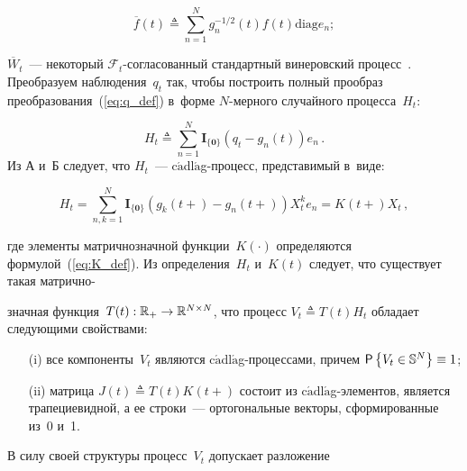 \begin{multicols}{2}
\vspace*{-2pt}

\noindent 
$$
\overline{f}(t) \triangleq \sum\limits_{n=1}^N g_n^{-{1}/{2}}(t)f(t) 
\mathrm{diag} e_n;
$$

\vspace*{-2pt}

\noindent
$\overline{W}_t$~--- некоторый $\mathcal{F}_t$-со\-гла\-со\-ван\-ный 
стандартный винеровский процесс~\cite{LSh_1_01}. Преобразуем наблюдения~$q_t$ так, чтобы 
построить полный прообраз преобразования~(\ref{eq:q_def}) в~форме $N$-мер\-но\-го случайного процесса~$H_t$:

\vspace*{-2pt}

\noindent
  $$
H_t \triangleq \sum\limits_{n=1}^N\mathbf{I}_{\{\mathbf{0}\}}\left(q_t-g_n(t)\right)e_n\,.
$$
Из А и~Б следует, что  $H_t$~--- {c$\acute{\mbox{a}}$dl$\acute{\mbox{a}}$g}-про\-цесс,
представимый в~виде:

\vspace*{2pt}

\noindent
  \begin{equation*}
H_t =  \sum\limits_{n,k=1}^N\mathbf{I}_{\{\mathbf{0}\}}\left(g_k(t+)-g_n(t+)\right)X_t^ke_n=K(t+)X_t\,,
\end{equation*}

\vspace*{-2pt}

\noindent
где элементы матричнозначной функции~$K(\cdot)$ определяются формулой~(\ref{eq:K_def}). 
Из определения~$H_t$  и~$K(t)$ следует, что существует такая матрично-\linebreak\vspace*{-12pt}

\columnbreak

\noindent
значная функция~$T(t): 
\mathbb{R}_+ \hm\to \mathbb{R}^{N \times N}$, что процесс
$
V_t \triangleq  T(t)H_t$
обладает следующими свойствами:
\begin{itemize}
\item[(i)]
все компоненты~$V_t$ являются
{c$\acute{\mbox{a}}$dl$\acute{\mbox{a}}$g}-про\-цес\-са\-ми, причем
$\pp{V_t \in \mathbb{S}^N} \hm\equiv 1$;
\item[(ii)]
матрица $J(t) \triangleq T(t)K(t+)$ состоит из {c$\acute{\mbox{a}}$dl$\acute{\mbox{a}}$g}-эле\-мен\-тов, 
является трапециевидной, а ее строки~--- ортогональные векторы, сформированные из~0  и~1.
\end{itemize}
В силу своей структуры процесс~$V_t$ допускает разложение 


\end{multicols}
